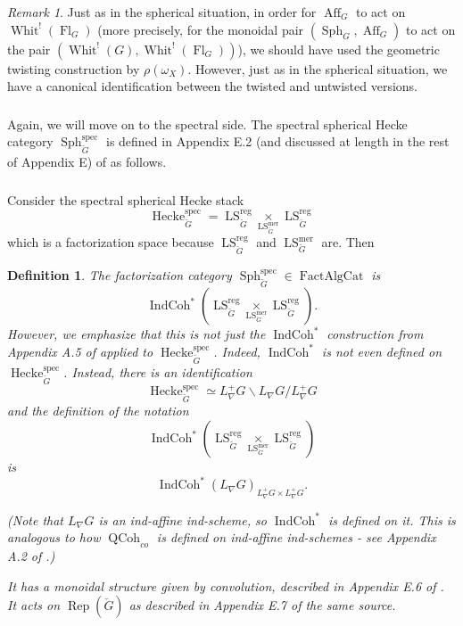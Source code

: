 \documentclass[10pt]{amsart}
\newtheorem{defn}[subsubsection]{Definition}
\theoremstyle{remark}
\newtheorem{rem}[subsubsection]{Remark}
\newcommand{\on}[1]{\operatorname{#1}}
\newcommand{\QCoh}{\on{QCoh}}
\newcommand{\IndCoh}{\on{IndCoh}}
\newcommand{\Gcheck}{\check{G}}
\newcommand{\FactAlgCat}{\on{FactAlgCat}}
\newcommand{\sssec}[1]{\subsubsection{}}
\begin{document}
\begin{rem}
Just as in the spherical situation, in order for $\on{Aff}_G$ to act on $\on{Whit}^!(\on{Fl}_G)$ (more precisely, for the monoidal pair $(\on{Sph}_G, \on{Aff}_G)$ to act on the pair $(\on{Whit}^!(G), \on{Whit}^!(\on{Fl}_G))$), we should have used the geometric twisting construction by $\rho(\omega_X)$. However, just as in the spherical situation, we have a canonical identification between the twisted and untwisted versions.
\end{rem}

\sssec{}
Again, we will move on to the spectral side. The spectral spherical Hecke category $\on{Sph}_{\Gcheck}^{\on{spec}}$ is defined in Appendix E.2 (and discussed at length in the rest of Appendix E) of \cite{GLC2} as follows.

\sssec{}
Consider the spectral spherical Hecke stack
$$
\on{Hecke}_{\Gcheck}^{\on{spec}} = \on{LS}_{\Gcheck}^{\on{reg}} \underset{\on{LS}_{\Gcheck}^{\on{mer}}}{\times} \on{LS}_{\Gcheck}^{\on{reg}}
$$
which is a factorization space because $\on{LS}_{\Gcheck}^{\on{reg}}$ and $\on{LS}_{\Gcheck}^{\on{mer}}$ are. Then

\begin{defn}
    The factorization category $\on{Sph}_{\Gcheck}^{\on{spec}} \in \FactAlgCat$ is
    $$
    \IndCoh^*(\on{LS}_{\Gcheck}^{\on{reg}} \underset{\on{LS}_{\Gcheck}^{\on{mer}}}{\times} \on{LS}_{\Gcheck}^{\on{reg}}).
    $$
    However, we emphasize that this is \emph{not} just the $\IndCoh^*$ construction from Appendix A.5 of \cite{GLC2} applied to $\on{Hecke}_{\Gcheck}^{\on{spec}}$. Indeed, $\IndCoh^*$ is not even defined on $\on{Hecke}_{\Gcheck}^{\on{spec}}$. Instead, there is an identification
    $$
    \on{Hecke}_{\Gcheck}^{\on{spec}} \simeq L_{\nabla}^+G \backslash L_{\nabla}G/L_{\nabla}^+G
    $$
    and the definition of the notation
    $$
    \IndCoh^*(\on{LS}_{\Gcheck}^{\on{reg}} \underset{\on{LS}_{\Gcheck}^{\on{mer}}}{\times} \on{LS}_{\Gcheck}^{\on{reg}})
    $$
    is 
    $$
    \IndCoh^*(L_{\nabla}G)_{L_{\nabla}^+G \times L_{\nabla}^+G}.
    $$
    
    (Note that $L_{\nabla}G$ is an ind-affine ind-scheme, so $\IndCoh^*$ is defined on it. This is analogous to how $\QCoh_{co}$ is defined on ind-affine ind-schemes - see Appendix A.2 of \cite{GLC2}.)
    
    It has a monoidal structure given by convolution, described in Appendix E.6 of \cite{GLC2}. It acts on $\on{Rep}(\Gcheck)$ as described in Appendix E.7 of the same source.
\end{defn}
\end{document}
